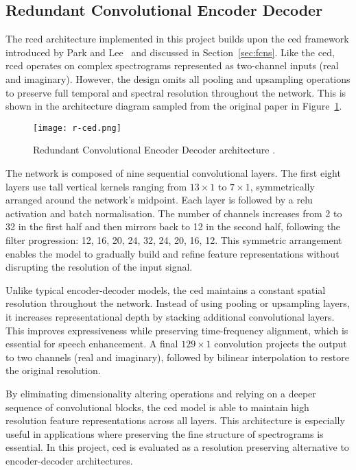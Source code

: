 \subsection{Redundant Convolutional Encoder Decoder}
\label{sec:rced}

The \gls{rced} architecture implemented in this project builds upon the \gls{ced} framework introduced by Park and Lee~\cite{park2017acoustic} and discussed in Section~\ref{sec:fcns}. Like the \gls{ced}, \gls{rced} operates on complex spectrograms represented as two-channel inputs (real and imaginary). However, the design omits all pooling and upsampling operations to preserve full temporal and spectral resolution throughout the network. This is shown in the architecture diagram sampled from the original paper in Figure~\ref{fig:rced}.

\begin{figure}[h]
    \centering
    \texttt{[image: r-ced.png]}
    \caption{\label{fig:rced} Redundant Convolutional Encoder Decoder architecture \cite{park2017acoustic}.}
\end{figure}

The network is composed of nine sequential convolutional layers. The first eight layers use tall vertical kernels ranging from \(13 \times 1\) to \(7 \times 1\), symmetrically arranged around the network's midpoint. Each layer is followed by a \gls{relu} activation and batch normalisation. The number of channels increases from 2 to 32 in the first half and then mirrors back to 12 in the second half, following the filter progression: 12, 16, 20, 24, 32, 24, 20, 16, 12. This symmetric arrangement enables the model to gradually build and refine feature representations without disrupting the resolution of the input signal.

Unlike typical encoder-decoder models, the \gls{ced} maintains a constant spatial resolution throughout the network. Instead of using pooling or upsampling layers, it increases representational depth by stacking additional convolutional layers. This improves expressiveness while preserving time-frequency alignment, which is essential for speech enhancement. A final 
\(129 \times 1\) convolution projects the output to two channels (real and imaginary), followed by bilinear interpolation to restore the original resolution.

By eliminating dimensionality altering operations and relying on a deeper sequence of convolutional blocks, the \gls{ced} model is able to maintain high resolution feature representations across all layers. This architecture is especially useful in applications where preserving the fine structure of spectrograms is essential. In this project, \gls{ced} is evaluated as a resolution preserving alternative to encoder-decoder architectures.

